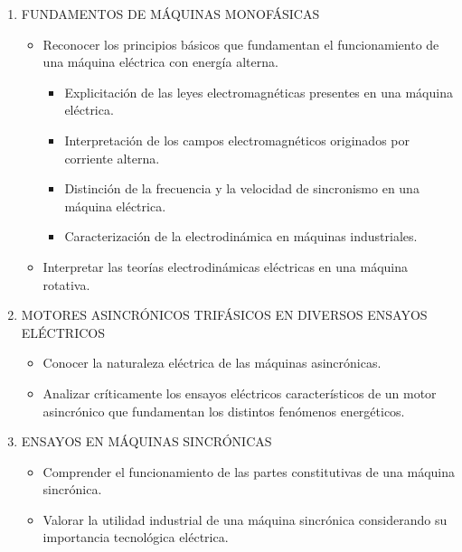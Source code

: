 \documentclass[../main]{subfiles}
\begin{document}
\begin{enumerate}
  \item FUNDAMENTOS DE MÁQUINAS MONOFÁSICAS
    \begin{itemize}
      \item Reconocer los principios básicos que fundamentan el
        funcionamiento de una máquina eléctrica con energía alterna.
        \begin{itemize}
          \item Explicitación de las leyes electromagnéticas presentes en
            una máquina eléctrica.
          \item Interpretación de los campos electromagnéticos
            originados por corriente alterna.
          \item Distinción de la frecuencia y la velocidad de sincronismo
            en una máquina eléctrica.
          \item Caracterización de la electrodinámica en máquinas
            industriales.
        \end{itemize}

      \item Interpretar las teorías electrodinámicas eléctricas en
        una máquina rotativa.
    \end{itemize}
  \item MOTORES ASINCRÓNICOS TRIFÁSICOS EN DIVERSOS ENSAYOS ELÉCTRICOS
    \begin{itemize}
      \item Conocer la naturaleza
        eléctrica de las máquinas
        asincrónicas.
      \item Analizar críticamente los
        ensayos eléctricos
        característicos de un motor
        asincrónico que
        fundamentan los distintos
        fenómenos energéticos.

    \end{itemize}
  \item ENSAYOS EN MÁQUINAS SINCRÓNICAS
    \begin{itemize}
      \item Comprender el
        funcionamiento de las
        partes constitutivas de una
        máquina sincrónica.
      \item Valorar la utilidad industrial
        de una máquina sincrónica
        considerando su
        importancia tecnológica
        eléctrica.
    \end{itemize}
\end{enumerate}
\end{document}
